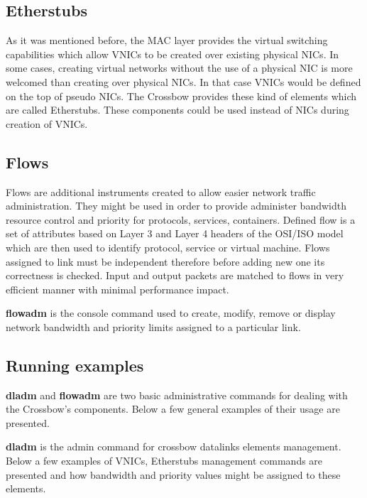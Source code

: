 \documentclass[11pt]{book}
\begin{document}
		\subsection{Etherstubs}

                        As it was mentioned before, the MAC layer provides the virtual switching capabilities which allow VNICs to be created over existing physical NICs.
                        In some cases, creating virtual networks without the use of a physical NIC is more welcomed than creating over physical NICs. In that case VNICs 
                        would be defined on the top of pseudo NICs. The Crossbow provides these kind of elements which are called Etherstubs. These components could be used
                        instead of NICs during creation of VNICs.

                \subsection{Flows}

                        Flows are additional instruments created to allow easier network traffic administration. They might be used in order to provide administer bandwidth resource control and priority for protocols, services, containers.
                        Defined flow is a set of attributes based on Layer 3 and Layer 4 headers of the OSI/ISO model which are then used to identify protocol, service or virtual machine. 
                        Flows assigned to link must be independent therefore before adding new one its correctness is checked. Input and output packets are matched to flows in very efficient 
                        manner with minimal performance impact.

                        \medskip

                        \textbf{flowadm} is the console command used to create, modify, remove or display network bandwidth and priority limits assigned to a particular link. 


                \subsection{Running examples}

                        \textbf{dladm} and \textbf{flowadm} are two basic administrative commands for dealing with the Crossbow's components. Below a few general examples of their usage are presented.

                        \textbf{dladm} is the admin command for crossbow datalinks elements management. Below a few examples of VNICs, Etherstubs management commands are presented and how
                        bandwidth and priority values might be assigned to these elements.
\end{document}
